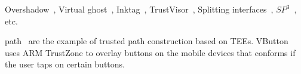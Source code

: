 Overshadow~\cite{Overshadow}, Virtual ghost~\cite{criswell2014virtual}, Inktag~\cite{hofmann2013inktag}, TrustVisor~\cite{mccune2010trustvisor}, Splitting interfaces~\cite{ta2006splitting}, $SP^3$~\cite{yang2008using}, etc.



path~\cite{filyanov2011uni,sun2015trustotp} are the example of trusted path construction based on TEEs. VButton~\cite{li2018vbutton} uses ARM TrustZone to overlay buttons on the mobile devices that conforms if the user taps on certain buttons.


